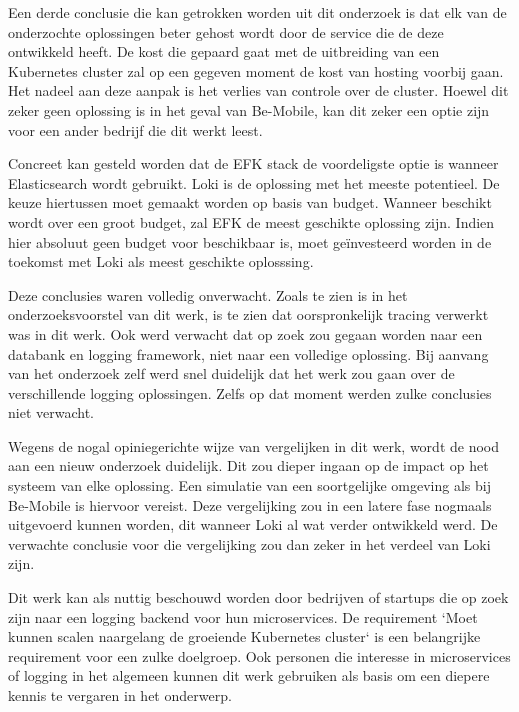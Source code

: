 Een derde conclusie die kan getrokken worden uit dit onderzoek is dat elk van de onderzochte oplossingen beter gehost wordt door de service die de deze ontwikkeld heeft. De kost die gepaard gaat met de uitbreiding van een Kubernetes cluster zal op een gegeven moment de kost van hosting voorbij gaan. Het nadeel aan deze aanpak is het verlies van controle over de cluster. Hoewel dit zeker geen oplossing is in het geval van Be-Mobile, kan dit zeker een optie zijn voor een ander bedrijf die dit werkt leest.

Concreet kan gesteld worden dat de EFK stack de voordeligste optie is wanneer Elasticsearch wordt gebruikt. Loki is de oplossing met het meeste potentieel. De keuze hiertussen moet gemaakt worden op basis van budget. Wanneer beschikt wordt over een groot budget, zal EFK de meest geschikte oplossing zijn. Indien hier absoluut geen budget voor beschikbaar is, moet geïnvesteerd worden in de toekomst met Loki als meest geschikte oplosssing.

Deze conclusies waren volledig onverwacht. Zoals te zien is in het onderzoeksvoorstel van dit werk, is te zien dat oorspronkelijk tracing verwerkt was in dit werk. Ook werd verwacht dat op zoek zou gegaan worden naar een databank en logging framework, niet naar een volledige oplossing. Bij aanvang van het onderzoek zelf werd snel duidelijk dat het werk zou gaan over de verschillende logging oplossingen. Zelfs op dat moment werden zulke conclusies niet verwacht. 

Wegens de nogal opiniegerichte wijze van vergelijken in dit werk, wordt de nood aan een nieuw onderzoek duidelijk. Dit zou dieper ingaan op de impact op het systeem van elke oplossing. Een simulatie van een soortgelijke omgeving als bij Be-Mobile is hiervoor vereist. Deze vergelijking zou in een latere fase nogmaals uitgevoerd kunnen worden, dit wanneer Loki al wat verder ontwikkeld werd. De verwachte conclusie voor die vergelijking zou dan zeker in het verdeel van Loki zijn.

Dit werk kan als nuttig beschouwd worden door bedrijven of startups die op zoek zijn naar een logging backend voor hun microservices. De requirement `Moet kunnen scalen naargelang de groeiende Kubernetes cluster` is een belangrijke requirement voor een zulke doelgroep. Ook personen die interesse in microservices of logging in het algemeen kunnen dit werk gebruiken als basis om een diepere kennis te vergaren in het onderwerp.